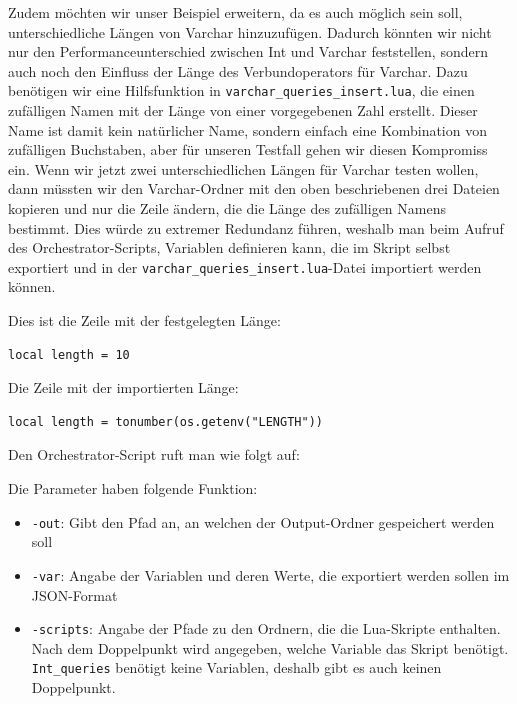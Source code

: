 Zudem möchten wir unser Beispiel erweitern, da es auch möglich sein soll, unterschiedliche Längen von Varchar hinzuzufügen.
Dadurch könnten wir nicht nur den Performanceunterschied zwischen Int und Varchar feststellen, sondern auch noch den Einfluss der Länge des Verbundoperators für Varchar.
Dazu benötigen wir eine Hilfsfunktion in \texttt{varchar\_queries\_insert.lua}, die einen zufälligen Namen mit der Länge von einer vorgegebenen Zahl erstellt.
Dieser Name ist damit kein natürlicher Name, sondern einfach eine Kombination von zufälligen Buchstaben, aber für unseren Testfall gehen wir diesen Kompromiss ein.
Wenn wir jetzt zwei unterschiedlichen Längen für Varchar testen wollen, dann müssten wir den Varchar-Ordner mit den oben beschriebenen drei Dateien kopieren und nur die Zeile ändern, die die Länge des zufälligen Namens bestimmt.
Dies würde zu extremer Redundanz führen, weshalb man beim Aufruf des Orchestrator-Scripts, Variablen definieren kann, die im Skript selbst exportiert und in der \texttt{varchar\_queries\_insert.lua}-Datei importiert werden können.

Dies ist die Zeile mit der festgelegten Länge:
\vspace{-5pt}
\begin{lstlisting}[language={[5.0]Lua},label={lst:without_imported_length,style=custom_daniel}]
local length = 10
\end{lstlisting}
\vspace{-5pt}

Die Zeile mit der importierten Länge:
\vspace{-5pt}
\begin{lstlisting}[language={[5.0]Lua},label={lst:with_imported_length,style=custom_daniel}]
local length = tonumber(os.getenv("LENGTH"))
\end{lstlisting}
\vspace{-5pt}

Den Orchestrator-Script ruft man wie folgt auf:
\vspace{-5pt}

\vspace{-5pt}

Die Parameter haben folgende Funktion:
\begin{itemize}[label=--]
    \item \texttt{-out}: Gibt den Pfad an, an welchen der Output-Ordner gespeichert werden soll
    \item \texttt{-var}: Angabe der Variablen und deren Werte, die exportiert werden sollen im JSON-Format
    \item \texttt{-scripts}: Angabe der Pfade zu den Ordnern, die die Lua-Skripte enthalten.
    Nach dem Doppelpunkt wird angegeben, welche Variable das Skript benötigt. \texttt{Int\_queries} benötigt keine Variablen, deshalb gibt es auch keinen Doppelpunkt.
\end{itemize}

